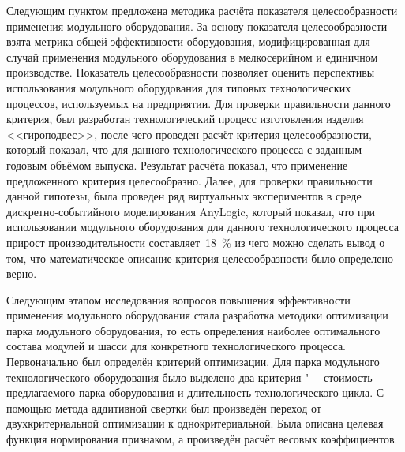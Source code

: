 Следующим пунктом предложена методика расчёта показателя целесообразности применения модульного оборудования. За основу показателя целесообразности взята метрика общей эффективности оборудования, модифицированная для случай применения модульного оборудования в мелкосерийном и единичном производстве. Показатель целесообразности позволяет оценить перспективы использования модульного оборудования для типовых технологических процессов, используемых на предприятии. Для проверки правильности данного критерия, был разработан технологический процесс изготовления изделия <<гироподвес>>, после чего проведен расчёт критерия целесообразности, который показал, что для данного технологического процесса с заданным годовым объёмом выпуска. Результат расчёта показал, что применение предложенного критерия целесообразно. Далее, для проверки правильности данной гипотезы, была проведен ряд виртуальных экспериментов в среде дискретно-событийного моделирования AnyLogic, который показал, что при использовании модульного оборудования для данного технологического процесса прирост производительности составляет~\SI{18}{\percent} из чего можно сделать вывод о том, что математическое описание критерия целесообразности было определено верно.

Следующим этапом исследования вопросов повышения эффективности применения модульного оборудования стала разработка методики оптимизации парка модульного оборудования, то есть определения наиболее оптимального состава модулей и шасси для конкретного технологического процесса. Первоначально был определён критерий оптимизации. Для парка модульного технологического оборудования было выделено два критерия "--- стоимость предлагаемого парка оборудования и длительность технологического цикла. С помощью метода аддитивной свертки был произведён переход от двухкритериальной оптимизации к однокритериальной. Была описана целевая функция нормирования признаком, а произведён расчёт весовых коэффициентов.

\FloatBarrier